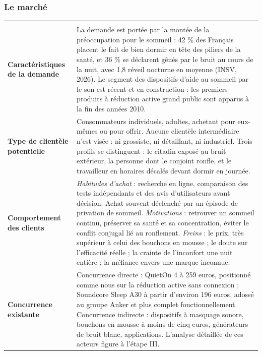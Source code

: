 \subsubsection{Le marché}

\begin{center}
\begin{xltabular}{\textwidth}{P{4cm}L}
\toprule
{} &  \\
\midrule
\endfirsthead
\toprule
{} &  \\
\midrule
\endhead

\textbf{Caractéristiques de la demande}
&
La demande est portée par la montée de la préoccupation pour le sommeil : 42 \%
des Français placent le fait de bien dormir en tête des piliers de la santé, et
36 \% se déclarent gênés par le bruit au cours de la nuit, avec 1,8 réveil
nocturne en moyenne (INSV, 2026). Le segment des dispositifs d'aide au sommeil
par le son est récent et en construction : les premiers produits à réduction
active grand public sont apparus à la fin des années 2010. \\

\textbf{Type de clientèle potentielle}
&
Consommateurs individuels, adultes, achetant pour eux-mêmes ou pour offrir.
Aucune clientèle intermédiaire n'est visée : ni grossiste, ni détaillant, ni
industriel. Trois profils se distinguent : le citadin exposé au bruit extérieur,
la personne dont le conjoint ronfle, et le travailleur en horaires décalés
devant dormir en journée. \\

\textbf{Comportement des clients}
&
\textit{Habitudes d'achat} : recherche en ligne, comparaison des tests
indépendants et des avis d'utilisateurs avant décision. Achat souvent déclenché
par un épisode de privation de sommeil.
\newline
\textit{Motivations} : retrouver un sommeil continu, préserver sa santé et sa
concentration, éviter le conflit conjugal lié au ronflement.
\newline
\textit{Freins} : le prix, très supérieur à celui des bouchons en mousse ; le
doute sur l'efficacité réelle ; la crainte de l'inconfort une nuit entière ;
la méfiance envers une marque inconnue. \\

\textbf{Concurrence existante}
&
Concurrence directe : QuietOn 4 à 259 euros, positionné comme nous sur la
réduction active sans connexion ; Soundcore Sleep A30 à partir d'environ 196
euros, adossé au groupe Anker et plus complet fonctionnellement. Concurrence
indirecte : dispositifs à masquage sonore, bouchons en mousse à moins de cinq
euros, générateurs de bruit blanc, applications. L'analyse détaillée de ces
acteurs figure à l'étape III. \\
\bottomrule
\end{xltabular}
\end{center}

